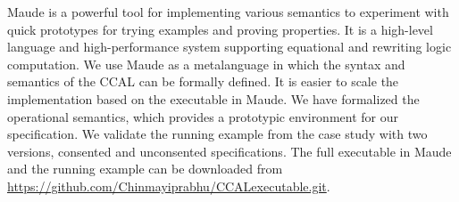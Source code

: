 Maude is a powerful tool for implementing various semantics to experiment with quick prototypes for trying examples and proving properties. It is a high-level language and high-performance system supporting equational and rewriting logic computation. We use Maude as a metalanguage in which the syntax and semantics of the CCAL  can be formally defined. It is easier to scale the implementation based on the executable in Maude. We have formalized the operational semantics,  which provides a prototypic environment for our specification. We validate the running example from the case study with two versions, consented and unconsented specifications. The full executable in Maude and the running example can be downloaded from \url{https://github.com/Chinmayiprabhu/CCALexecutable.git}. 